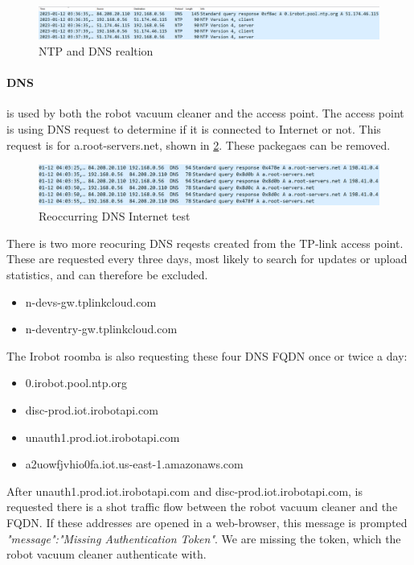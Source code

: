 \begin{figure}[H]
    \centering
    \includegraphics[width=\textwidth]{figures/ntp_dns.png}
    \caption{NTP and DNS realtion}
    \label{fig:ntp_dns}
\end{figure}

\paragraph{DNS} is used by both the robot vacuum cleaner and the access point. The access point is using DNS request to determine if it is connected to Internet or not. This request is for a.root-servers.net, shown in \ref{fig:dns_a-root}. These packegaes can be removed.

\begin{figure}[H]
    \centering
    \includegraphics[width=\textwidth]{figures/DNS_a-root.png}
    \caption{Reoccurring DNS Internet test}
    \label{fig:dns_a-root}
\end{figure}

There is two more reocuring DNS reqests created from the TP-link access point. These are requested every three days, most likely to search for updates or upload statistics, and can therefore be excluded.

\begin{itemize}
    \item n-devs-gw.tplinkcloud.com
    \item n-deventry-gw.tplinkcloud.com
\end{itemize}

The Irobot roomba is also requesting these four DNS FQDN once or twice a day: 
\begin{itemize}
    \item 0.irobot.pool.ntp.org
    \item disc-prod.iot.irobotapi.com
    \item unauth1.prod.iot.irobotapi.com
    \item a2uowfjvhio0fa.iot.us-east-1.amazonaws.com
\end{itemize}

After unauth1.prod.iot.irobotapi.com and disc-prod.iot.irobotapi.com, is requested there is a shot traffic flow between the robot vacuum cleaner and the FQDN. If these addresses are opened in a web-browser, this message is prompted \textit{"message":"Missing Authentication Token"}. We are missing the token, which the robot vacuum cleaner authenticate with. 

